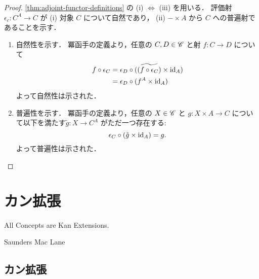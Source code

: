 \documentclass[titlepage]{ltjsreport}
\newtheorem[S]{theorem}{定理}[chapter]
\newtheorem[S]{definition}[theorem]{定義}
\newtheorem[S]{example}[theorem]{例}
\begin{document}
\begin{proof}
  \cref{thm:adjoint-functor-definitions} の (i) $\Leftrightarrow$ (iii) を用いる．
  評価射 $\epsilon_c:{C}^A\to C$ が
  (i) 対象 $C$ について自然であり，
  (ii) $-\times A$ から $C$ への普遍射であることを示す．

  \begin{enumerate}[label=(\roman*)] %
    \item 自然性を示す．
          冪函手の定義より，任意の $C,D\in\mathscr{C}$ と射 $f:C\to D$ について
          \begin{align*}
            f\circ\epsilon_C
             & =\epsilon_D\circ(\widetilde{(f\circ\epsilon_C)}\times\mathrm{id}_{A}) \\
             & =\epsilon_D\circ(f^A\times\mathrm{id}_{A})                            \\
          \end{align*}
          よって自然性は示された．
    \item 普遍性を示す．
          冪函手の定義より，任意の $X\in\mathscr{C}$ と $g:X\times A\to C$
          について以下を満たす$\tilde{g}:X\to C^A$ がただ一つ存在する:
          \begin{equation*}
            \epsilon_C\circ(\tilde{g}\times\mathrm{id}_{A})=g.
          \end{equation*}
          よって普遍性は示された．
  \end{enumerate}
\end{proof}

\chapter{カン拡張}

\epigraph{All Concepts are Kan Extensions.}{Saunders Mac Lane}

\section{カン拡張}
\end{document}
